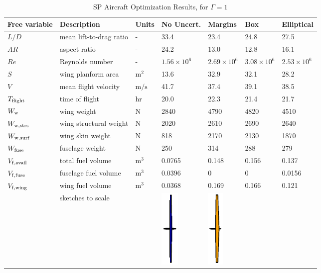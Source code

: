 \begin{table}[!h]
\begin{center}
\caption{\label{tab:results} SP Aircraft Optimization Results, for $\Gamma = 1$}
\begin{tabular}{C{2cm} C{3.8cm} C{1.25cm} C{1.6cm} C{1.6cm} C{1.6cm} C{1.6cm}}
\hline
Free variable & Description & Units & No Uncert. & Margins & Box & Elliptical \\
\hline
$L/D$ & mean lift-to-drag ratio & - & 33.4 & 23.4 & 24.8 & 27.5 \\
$AR$ & aspect ratio & - & 24.2 & 13.0 & 12.8 & 16.1 \\
$Re$ & Reynolds number & - & $1.56 \times 10^6$ & $2.69 \times 10^6$ & $3.08\times 10^6$ & $2.53 \times 10^6$ \\
$S$ & wing planform area &$\mathrm{m^2}$ & 13.6 & 32.9 & 32.1 & 28.2 \\
$V$ & mean flight velocity &$\mathrm{m/s}$ & 41.7 & 37.4 & 39.1 & 38.5 \\
$T_{\rm{flight}}$ & time of flight & $\mathrm{hr}$ & 20.0 & 22.3 & 21.4 & 21.7 \\
$W_{\rm{w}}$ & wing weight & $\mathrm{N}$ & 2840 & 4790 & 4820 & 4510 \\
$W_{\rm{w,strc}}$ & wing structural weight &$\mathrm{N}$ & 2020 & 2610 & 2690 & 2640 \\
$W_{\rm{w,surf}}$ & wing skin weight &$\mathrm{N}$ & 818 & 2170 & 2130 & 1870 \\
$W_{\rm{fuse}}$ & fuselage weight &$\mathrm{N}$ & 250 & 314 & 288 & 279 \\
$V_{\rm{f,avail}}$ & total fuel volume & $\mathrm{m^3}$ & 0.0765 & 0.148 & 0.156 & 0.137 \\
$V_{\rm{f,fuse}}$ & fuselage fuel volume & $\mathrm{m^3}$ & 0.0396 & 0 & 0 & 0.0156 \\
$V_{\rm{f,wing}}$ & wing fuel volume &$\mathrm{m^3}$ & 0.0368 & 0.169 & 0.166 & 0.121    \\
& sketches to scale & &
    \includegraphics[trim={9.5cm 1cm 9.5cm 1cm},clip,height=3.8cm]{nominal.eps} &
    \includegraphics[trim={9.5cm 1cm 9.5cm 1cm},clip,height=3.8cm]{margins.eps} &

\end{tabular}
\end{center}
\end{table}
